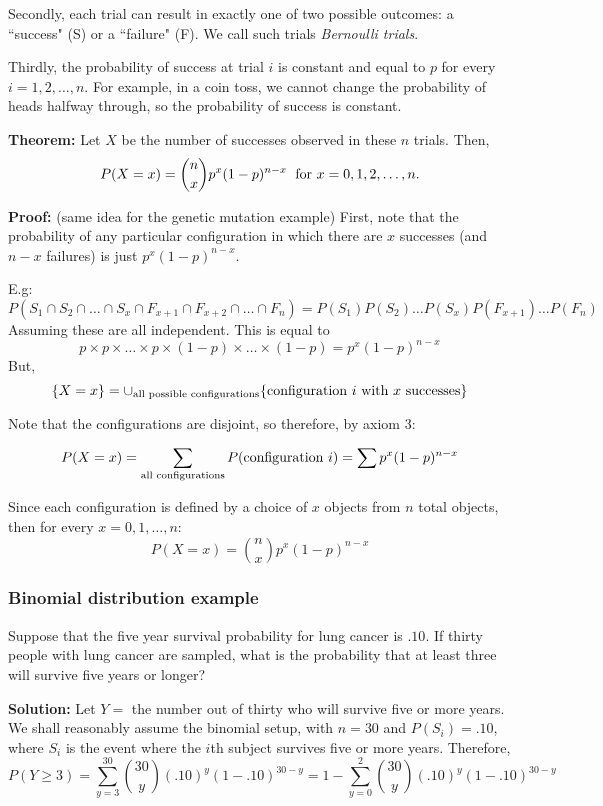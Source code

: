 \documentclass[12pt]{article}
\begin{document}
Secondly, each trial can result in exactly one of two possible outcomes: a ``success" (S) or a ``failure" (F). We call such trials \emph{Bernoulli trials}.

Thirdly, the probability of success at trial $i$ is constant and equal to $p$ for every $i = 1, 2, \dots, n$. For example, in a coin toss, we cannot change the probability of heads halfway through, so the probability of success is constant.

\textbf{Theorem:} Let $X$ be the number of successes observed in these $n$ trials. Then,
\[
    P(X = x) = {n \choose x} p^x (1-p)^{n - x} \; \textnormal{ for } x = 0,1,2,\ldots, n.
\]

\textbf{Proof:} (same idea for the genetic mutation example) First, note that the probability of any particular configuration in which there are $x$ successes (and $n-x$ failures) is just $p^x (1-p)^{n-x}$.

E.g:
\[ P(S_1 \cap S_2 \cap \ldots \cap S_x \cap F_{x+1} \cap F_{x+2} \cap \ldots \cap F_n) = P(S_1) P(S_2) \ldots P(S_x) P(F_{x+1}) \ldots P(F_n) \]
Assuming these are all independent. This is equal to
\[
    p \times p \times  \ldots \times p \times (1-p) \times \ldots \times (1-p) = p^x (1-p)^{n-x}
\]
But,
\[
    \{ X = x \} = \cup_{\textnormal{all possible configurations}} \{ \textnormal{configuration $i$ with $x$ successes} \}
\]

Note that the configurations are disjoint, so therefore, by axiom 3:

\[
    P(X = x) = \sum_{\textnormal{all configurations}} P(\textnormal{configuration } i) = \sum p^x (1-p)^{n-x}
\]

Since each configuration is defined by a choice of $x$ objects from $n$ total objects, then for every $x = 0, 1, \ldots, n$:
\[
    P (X = x) = {n \choose x} p^x (1-p)^{n-x}
\]

\subsubsection{Binomial distribution example}
Suppose that the five year survival probability for lung cancer is $.10$. If thirty people with lung cancer are sampled, what is the probability that at least three will survive five years or longer?

\textbf{Solution:} Let $Y =$ the number out of thirty who will survive five or more years. We shall reasonably assume the binomial setup, with $n = 30$ and $P(S_i) = .10$, where $S_i$ is the event where the $i$th subject survives five or more years. Therefore,
\[
    P(Y \geq 3) = \sum_{y=3}^{30} {30 \choose y} (.10)^y (1-.10)^{30-y} = 1 - \sum_{y=0}^{2} {30 \choose y} (.10)^y (1-.10)^{30-y}
\]
\end{document}
